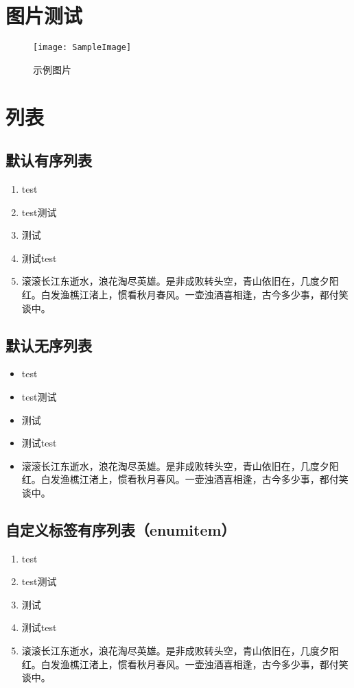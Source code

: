 \documentclass{../../PublicResources/DocClassLight}
\begin{document}
    \section{图片测试}
    \begin{figure}[h]
        \centering
        \texttt{[image: SampleImage]}
        \caption{示例图片}
    \end{figure}

    \section{列表}
    \subsection{默认有序列表}
    \begin{enumerate}
        \item test
        \item test测试
        \item 测试
        \item 测试test
        \item 滚滚长江东逝水，浪花淘尽英雄。是非成败转头空，青山依旧在，几度夕阳红。白发渔樵江渚上，惯看秋月春风。一壶浊酒喜相逢，古今多少事，都付笑谈中。
    \end{enumerate}

    \subsection{默认无序列表}
    \begin{itemize}
        \item test
        \item test测试
        \item 测试
        \item 测试test
        \item 滚滚长江东逝水，浪花淘尽英雄。是非成败转头空，青山依旧在，几度夕阳红。白发渔樵江渚上，惯看秋月春风。一壶浊酒喜相逢，古今多少事，都付笑谈中。
    \end{itemize}

    \subsection{自定义标签有序列表（enumitem）}
    \begin{enumerate}[label={Step \arabic*.}]
        \item test
        \item test测试
        \item 测试
        \item 测试test
        \item 滚滚长江东逝水，浪花淘尽英雄。是非成败转头空，青山依旧在，几度夕阳红。白发渔樵江渚上，惯看秋月春风。一壶浊酒喜相逢，古今多少事，都付笑谈中。
    \end{enumerate}
\end{document}
